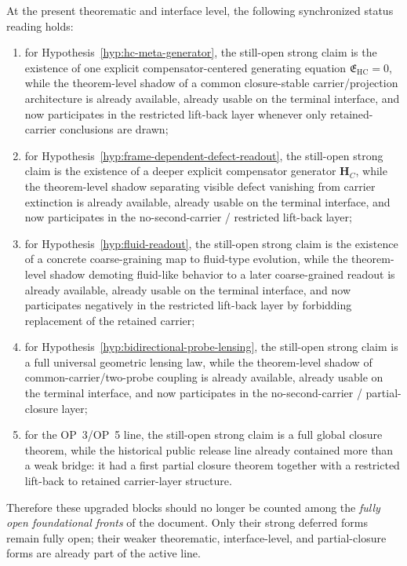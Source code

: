 \begin{proposition}
\label{prop:v322-hypothesis-open-question-status-synchronization-principle}
At the present theorematic and interface level, the following synchronized status reading holds:
\begin{enumerate}[leftmargin=2em,label=(\roman*)]
 \item for Hypothesis~\ref{hyp:hc-meta-generator}, the still-open strong claim is the existence of one explicit compensator-centered generating equation $\mathfrak E_{\mathrm{HC}}=0$, while the theorem-level shadow of a common closure-stable carrier/projection architecture is already available, already usable on the terminal interface, and now participates in the restricted lift-back layer whenever only retained-carrier conclusions are drawn;
 \item for Hypothesis~\ref{hyp:frame-dependent-defect-readout}, the still-open strong claim is the existence of a deeper explicit compensator generator $\mathbf H_C$, while the theorem-level shadow separating visible defect vanishing from carrier extinction is already available, already usable on the terminal interface, and now participates in the no-second-carrier / restricted lift-back layer;
 \item for Hypothesis~\ref{hyp:fluid-readout}, the still-open strong claim is the existence of a concrete coarse-graining map to fluid-type evolution, while the theorem-level shadow demoting fluid-like behavior to a later coarse-grained readout is already available, already usable on the terminal interface, and now participates negatively in the restricted lift-back layer by forbidding replacement of the retained carrier;
 \item for Hypothesis~\ref{hyp:bidirectional-probe-lensing}, the still-open strong claim is a full universal geometric lensing law, while the theorem-level shadow of common-carrier/two-probe coupling is already available, already usable on the terminal interface, and now participates in the no-second-carrier / partial-closure layer;
 \item for the OP~3/OP~5 line, the still-open strong claim is a full global closure theorem, while the historical public  release line already contained more than a weak bridge: it had a first partial closure theorem together with a restricted lift-back to retained carrier-layer structure.
\end{enumerate}
Therefore these upgraded blocks should no longer be counted among the \emph{fully open foundational fronts} of the document. Only their strong deferred forms remain fully open; their weaker theorematic, interface-level, and partial-closure forms are already part of the active line.
\end{proposition}

